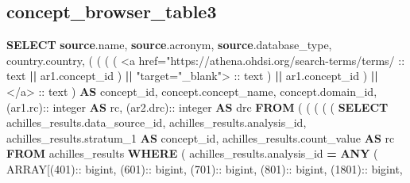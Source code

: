 \documentclass[
]{book}
\newenvironment{Shaded}{\begin{snugshade}}{\end{snugshade}}
\newcommand{\DataTypeTok}[1]{\textcolor[rgb]{0.13,0.29,0.53}{#1}}
\newcommand{\DecValTok}[1]{\textcolor[rgb]{0.00,0.00,0.81}{#1}}
\newcommand{\KeywordTok}[1]{\textcolor[rgb]{0.13,0.29,0.53}{\textbf{#1}}}
\newcommand{\NormalTok}[1]{#1}
\newcommand{\OperatorTok}[1]{\textcolor[rgb]{0.81,0.36,0.00}{\textbf{#1}}}
\newcommand{\StringTok}[1]{\textcolor[rgb]{0.31,0.60,0.02}{#1}}
\begin{document}
\hypertarget{concept_browser_table3}{%
\subsection*{concept\_browser\_table3}\label{concept_browser_table3}}

\begin{Shaded}
\begin{Highlighting}[]
\KeywordTok{SELECT}
  \KeywordTok{source}\NormalTok{.name,}
  \KeywordTok{source}\NormalTok{.acronym,}
  \KeywordTok{source}\NormalTok{.database\_type,}
\NormalTok{  country.country,}
\NormalTok{  (}
\NormalTok{    (}
\NormalTok{      (}
\NormalTok{        (}
\StringTok{\textquotesingle{}\textless{}a href="https://athena.ohdsi.org/search{-}terms/terms/\textquotesingle{}}\NormalTok{ :: text}
          \OperatorTok{||}\NormalTok{ ar1.concept\_id}
\NormalTok{        ) }\OperatorTok{||} \StringTok{\textquotesingle{}"target="\_blank"\textgreater{}\textquotesingle{}}\NormalTok{ :: text}
\NormalTok{      ) }\OperatorTok{||}\NormalTok{ ar1.concept\_id}
\NormalTok{    ) }\OperatorTok{||} \StringTok{\textquotesingle{}\textless{}/a\textgreater{}\textquotesingle{}}\NormalTok{ :: text}
\NormalTok{  ) }\KeywordTok{AS}\NormalTok{ concept\_id,}
\NormalTok{  concept.concept\_name,}
\NormalTok{  concept.domain\_id,}
\NormalTok{  (ar1.rc):: }\DataTypeTok{integer} \KeywordTok{AS}\NormalTok{ rc,}
\NormalTok{  (ar2.drc):: }\DataTypeTok{integer} \KeywordTok{AS}\NormalTok{ drc}
\KeywordTok{FROM}
\NormalTok{  (}
\NormalTok{    (}
\NormalTok{      (}
\NormalTok{        (}
\NormalTok{          (}
            \KeywordTok{SELECT}
\NormalTok{              achilles\_results.data\_source\_id,}
\NormalTok{              achilles\_results.analysis\_id,}
\NormalTok{              achilles\_results.stratum\_1 }\KeywordTok{AS}\NormalTok{ concept\_id,}
\NormalTok{              achilles\_results.count\_value }\KeywordTok{AS}\NormalTok{ rc}
            \KeywordTok{FROM}
\NormalTok{              achilles\_results}
            \KeywordTok{WHERE}
\NormalTok{              (}
\NormalTok{                achilles\_results.analysis\_id }\OperatorTok{=} \KeywordTok{ANY}\NormalTok{ (}
                  \DataTypeTok{ARRAY}\NormalTok{[(}\DecValTok{401}\NormalTok{):: bigint,}
\NormalTok{                  (}\DecValTok{601}\NormalTok{):: bigint,}
\NormalTok{                  (}\DecValTok{701}\NormalTok{):: bigint,}
\NormalTok{                  (}\DecValTok{801}\NormalTok{):: bigint,}
\NormalTok{                  (}\DecValTok{1801}\NormalTok{):: bigint,}

\end{Highlighting}
\end{Shaded}
\end{document}
